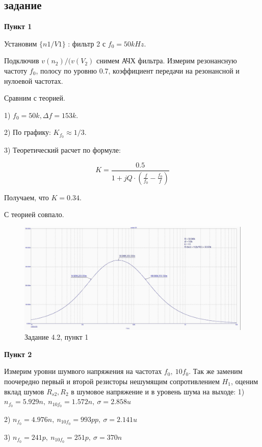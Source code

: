 \documentclass[a4paper, 14pt]{extarticle}%
\begin{document}
\subsection{задание}
\textbf{Пункт 1}


Установим $\{n1/V1\}$ : фильтр 2 с $f_0 = 50kHz$.


Подключив $v(n_2)/(v(V_2)$ снимем АЧХ фильтра. Измерим резонансную частоту $f_0$, полосу по уровню 0.7, коэффициент передачи на резонансной и нулоевой частотах.

Сравним с теорией.

1) $f_0 = 50k, \Delta f = 153k$.

2) По графику: $K_{f_0} \approx 1/3$.

3) Теоретический расчет по формуле:

\[ K = \frac{0.5}{1 + jQ\cdot(\frac{f}{f_0} - \frac{f_0}{f})}\]

Получаем, что $K = 0.34$.

С теорией совпало.


\begin{figure}[h!]
			\centering
			\includegraphics[width=1.1\linewidth]{4/4_2_2.jpg}
			\caption{Задание 4.2, пункт 1}
			\label{A}
\end{figure}


\textbf{Пункт 2}

Измерим уровни шумвого напряжения на частотах $f_0, \: 10f_0$. Так же заменим поочередно первый и второй резисторы нешумящим сопротивлением $H_1$, оценим вклад шумов $R_{s2}, R_2$ в шумовое напряжение и в уровень шума на выходе:
1) $n_{f_0} = 5.929n, \: n_{10f_0} = 1.572n, \: \sigma = 2.858u$

2) $n_{f_0} = 4.976n, \: n_{10f_0} = 993pp, \: \sigma = 2.141u$

3) $n_{f_0} = 241p, \: n_{10f_0} = 251p, \: \sigma = 370n$
\end{document}
